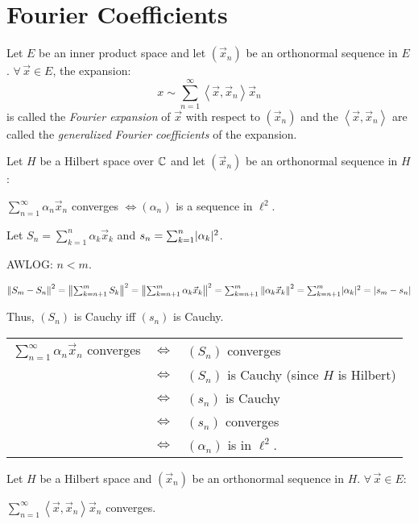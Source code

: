 \documentclass[letterpaper,12pt,fleqn]{article}
\newcommand{\vx}{\vec{x}}
\renewcommand{\a}{\alpha}
\newcommand{\norm}[1]{\left\|#1\right\|}
\newcommand{\inner}[1]{\left<#1\right>}
\begin{document}
\section*{Fourier Coefficients}

\begin{definition}
  Let $E$ be an inner product space and let $(\vx_n)$ be an orthonormal
  sequence in $E$. $\forall\,\vx\in E$, the expansion:
  \[x\sim\sum_{n=1}^{\infty}\inner{\vx,\vx_n}\vx_n\]
  is called the \emph{Fourier expansion} of $\vx$ with respect to $(\vx_n)$ and
  the $\inner{\vx,\vx_n}$ are called the
  \emph{generalized Fourier coefficients} of the expansion.
\end{definition}

\begin{theorem}
  Let $H$ be a Hilbert space over $\mathbb{C}$ and let $(\vx_n)$ be an orthonormal
  sequence in $H$:

  \qquad$\sum_{n=1}^{\infty}\a_n\vx_n$ converges $\iff(\a_n)$ is a sequence in
  $\ell^2$.
\end{theorem}

\begin{theproof}
  Let $S_n=\sum_{k=1}^n\a_k\vx_k$ and $s_n=\sum_{k=1}^n\abs{\a_k}^2$.
  
  AWLOG: $n<m$.

  $\norm{S_m-S_n}^2=\norm{\sum_{k=n+1}^mS_k}^2=\norm{\sum_{k=n+1}^m\a_k\vx_k}^2=
  \sum_{k=n+1}^m\norm{\a_k\vx_k}^2=\sum_{k=n+1}^m\abs{\a_k}^2=\abs{s_m-s_n}$

  Thus, $(S_n)$ is Cauchy iff $(s_n)$ is Cauchy.

  \begin{tabular}{lcl}
    $\sum_{n=1}^{\infty}\a_n\vx_n$ converges & $\iff$ & $(S_n)$ converges \\
    & $\iff$ & $(S_n)$ is Cauchy (since $H$ is Hilbert) \\
    & $\iff$ & $(s_n)$ is Cauchy \\
    & $\iff$ & $(s_n)$ converges \\
    & $\iff$ & $(\a_n)$ is in $\ell^2$.
  \end{tabular}
\end{theproof}

\begin{corollary}
  Let $H$ be a Hilbert space and $(\vx_n)$ be an orthonormal sequence in $H$.
  $\forall\,\vx\in E$:

  \qquad$\sum_{n=1}^{\infty}\inner{\vx,\vx_n}\vx_n$ converges.
\end{corollary}
\end{document}

